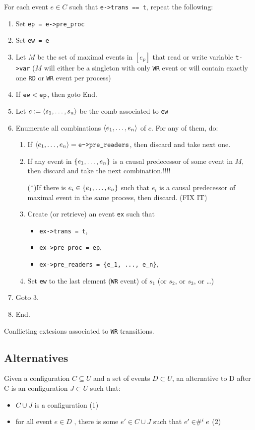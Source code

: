\documentclass{llncs}
\begin{document}
\begin{algorithm}
\noindent
For each event $e \in C$ such that \verb!e->trans == t!, repeat the following:
\begin{enumerate}
\item Set \verb!ep = e->pre_proc!
\item Set \verb!ew = e!
\item
  Let $M$ be the set of maximal events in $[e_p]$ that read or write variable
  \verb!t->var! ($M$ will either be a singleton with only \verb!WR! event or
  will contain exactly one \verb!RD! or \verb!WR! event per process)
\item If $\verb!ew! < \verb!ep!$, then goto End.
\item Let $c \mathrel{:=} \langle s_1, \ldots, s_n\rangle$ be the comb associated to \verb!ew!
\item
  Enumerate all combinations $\langle e_1, \ldots, e_n\rangle$ of $c$.
  For any of them, do:
  \begin{enumerate}
  \item
    If $\tup{e_1, \ldots, e_n} = \verb!e->pre_readers!$, then discard and take
    next one.
  \item
    If any event in ${\{ e_1, \ldots, e_n \mathclose \}}$ is a causal predecessor of some event in
    $M$, then discard and take the next combination.!!!!
    
    (*)If there is $e_i \in {\{ e_1, \ldots, e_n \mathclose \}}$ such that $e_i$ is a causal predecessor
    of maximal event in the same process, then discard. (FIX IT)
  \item
    Create (or retrieve) an event \verb!ex! such that
    \begin{itemize}
    \item \verb!ex->trans = t!,
    \item \verb!ex->pre_proc = ep!,
    \item \verb!ex->pre_readers = {e_1, ..., e_n}!,
    \end{itemize}
  \item
    Set \verb!ew! to the last element (\verb!WR! event) of $s_1$
    (or $s_2$, or $s_3$, or \ldots)
  \end{enumerate}
\item Goto 3.
\item End.
\end{enumerate}
\caption{Conflicting extesions associated to \texttt{WR} transitions.}
\label{a:cex_wr}
\end{algorithm}

\subsection{Alternatives}
\begin{definition}
Given a configuration $C \subseteq U$ and a set of events $D \subset U$, an alternative to D after C is an configuration $J \subset U $ such that:
\begin{itemize}
\item 
	$C \cup J$ is a configuration 						 (1)
\item
	for all event $e \in D$ , there is some $e'\in C \cup J$ such that $e' \in  \mathrel{\#^i_{}}{e}$ 	(2)
\end{itemize}
\end{definition}
\end{document}
